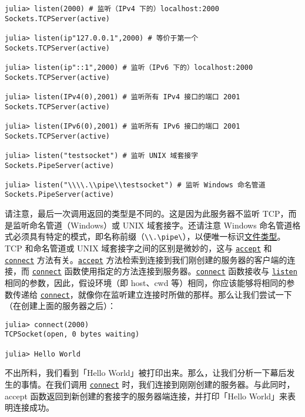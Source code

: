 \begin{verbatim}
julia> listen(2000) # 监听（IPv4 下的）localhost:2000
Sockets.TCPServer(active)

julia> listen(ip"127.0.0.1",2000) # 等价于第一个
Sockets.TCPServer(active)

julia> listen(ip"::1",2000) # 监听（IPv6 下的）localhost:2000
Sockets.TCPServer(active)

julia> listen(IPv4(0),2001) # 监听所有 IPv4 接口的端口 2001
Sockets.TCPServer(active)

julia> listen(IPv6(0),2001) # 监听所有 IPv6 接口的端口 2001
Sockets.TCPServer(active)

julia> listen("testsocket") # 监听 UNIX 域套接字
Sockets.PipeServer(active)

julia> listen("\\\\.\\pipe\\testsocket") # 监听 Windows 命名管道
Sockets.PipeServer(active)
\end{verbatim}



请注意，最后一次调用返回的类型是不同的。这是因为此服务器不监听 TCP，而是监听命名管道（Windows）或 UNIX 域套接字。还请注意 Windows 命名管道格式必须具有特定的模式，即名称前缀（\texttt{{\textbackslash}{\textbackslash}.{\textbackslash}pipe{\textbackslash}}），以便唯一标识\href{https://docs.microsoft.com/windows/desktop/ipc/pipe-names}{文件类型}。TCP 和命名管道或 UNIX 域套接字之间的区别是微妙的，这与 \hyperlink{1426793569216032849}{\texttt{accept}} 和 \hyperlink{5152827542417649360}{\texttt{connect}} 方法有关。\hyperlink{1426793569216032849}{\texttt{accept}} 方法检索到连接到我们刚创建的服务器的客户端的连接，而 \hyperlink{5152827542417649360}{\texttt{connect}} 函数使用指定的方法连接到服务器。\hyperlink{5152827542417649360}{\texttt{connect}} 函数接收与 \hyperlink{780704944207038170}{\texttt{listen}} 相同的参数，因此，假设环境（即 host、cwd 等）相同，你应该能够将相同的参数传递给 \hyperlink{5152827542417649360}{\texttt{connect}}，就像你在监听建立连接时所做的那样。那么让我们尝试一下（在创建上面的服务器之后）：




\begin{verbatim}
julia> connect(2000)
TCPSocket(open, 0 bytes waiting)

julia> Hello World
\end{verbatim}



不出所料，我们看到「Hello World」被打印出来。那么，让我们分析一下幕后发生的事情。在我们调用 \hyperlink{5152827542417649360}{\texttt{connect}} 时，我们连接到刚刚创建的服务器。与此同时，accept 函数返回到新创建的套接字的服务器端连接，并打印「Hello World」来表明连接成功。



